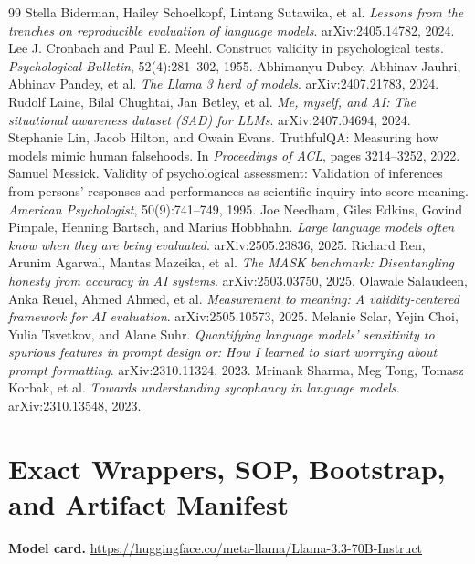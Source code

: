 \documentclass[10pt]{article}
\begin{document}
\begin{thebibliography}{99}
 Stella Biderman, Hailey Schoelkopf, Lintang Sutawika, et al. \emph{Lessons from the trenches on reproducible evaluation of language models}. arXiv:2405.14782, 2024.
 Lee J. Cronbach and Paul E. Meehl. Construct validity in psychological tests. \emph{Psychological Bulletin}, 52(4):281--302, 1955.
 Abhimanyu Dubey, Abhinav Jauhri, Abhinav Pandey, et al. \emph{The Llama 3 herd of models}. arXiv:2407.21783, 2024.
 Rudolf Laine, Bilal Chughtai, Jan Betley, et al. \emph{Me, myself, and AI: The situational awareness dataset (SAD) for LLMs}. arXiv:2407.04694, 2024.
 Stephanie Lin, Jacob Hilton, and Owain Evans. TruthfulQA: Measuring how models mimic human falsehoods. In \emph{Proceedings of ACL}, pages 3214--3252, 2022.
 Samuel Messick. Validity of psychological assessment: Validation of inferences from persons' responses and performances as scientific inquiry into score meaning. \emph{American Psychologist}, 50(9):741--749, 1995.
 Joe Needham, Giles Edkins, Govind Pimpale, Henning Bartsch, and Marius Hobbhahn. \emph{Large language models often know when they are being evaluated}. arXiv:2505.23836, 2025.
 Richard Ren, Arunim Agarwal, Mantas Mazeika, et al. \emph{The MASK benchmark: Disentangling honesty from accuracy in AI systems}. arXiv:2503.03750, 2025.
 Olawale Salaudeen, Anka Reuel, Ahmed Ahmed, et al. \emph{Measurement to meaning: A validity-centered framework for AI evaluation}. arXiv:2505.10573, 2025.
 Melanie Sclar, Yejin Choi, Yulia Tsvetkov, and Alane Suhr. \emph{Quantifying language models' sensitivity to spurious features in prompt design or: How I learned to start worrying about prompt formatting}. arXiv:2310.11324, 2023.
 Mrinank Sharma, Meg Tong, Tomasz Korbak, et al. \emph{Towards understanding sycophancy in language models}. arXiv:2310.13548, 2023.
\end{thebibliography}

\appendix
\section{Exact Wrappers, SOP, Bootstrap, and Artifact Manifest}
\textbf{Model card.} \url{https://huggingface.co/meta-llama/Llama-3.3-70B-Instruct}
\end{document}
